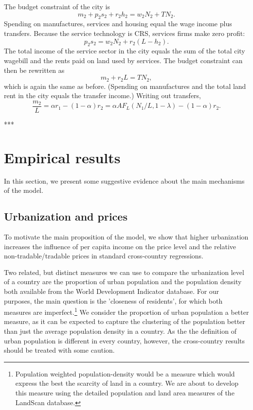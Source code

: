 \documentclass[12pt]{article}
\begin{document}
The budget constraint of the city is
\[
m_2 +p_2s_2+r_2h_2 = w_2N_2+TN_2.
\]
Spending on manufactures, services and housing equal the wage income plus transfers. Because the service technology is CRS, services firms make zero profit:
\[
p_2s_2 = w_2N_2+r_2(L-h_2).
\]
The total income of the service sector in the city equals the sum of the total city wagebill and the rents paid on land used by services. The budget constraint can then be rewritten as
\[
m_2 +r_2L = TN_2,
\]
which is again the same as before. (Spending on manufactures and the total land rent in the city equals the transfer income.) Writing out transfers,
\begin{equation}\label{eq:eq3b}
    \frac{m_2}{L} = \alpha r_1-(1-\alpha)r_2 = \alpha AF_L(N_1/L,1-{\lambda})-(1-\alpha)r_2.
\end{equation}

***


\section{Empirical results}
In this section, we present some suggestive evidence about the main
mechanisms of the model.

\subsection{Urbanization and prices}
To motivate the main proposition of the model, we show that higher
urbanization increases the influence of per capita income on the
price level and the relative non-tradable/tradable prices in
standard cross-country regressions.

Two related, but distinct measures we can use to compare the
urbanization level of a country are the proportion of urban
population and the population density both available from the World
Development Indicator database. For our purposes, the main question
is the 'closeness of residents', for which both measures are
imperfect.\footnote{Population weighted population-density would be
a measure which would express the best the scarcity of land in a
country. We are about to develop this measure using the detailed
population and land area measures of the LandScan database.} We
consider the proportion of urban population a better measure, as it
can be expected to capture the clustering of the population better
than just the average population density in a country. As the the
definition of urban population is different in every country,
however, the cross-country results should be treated with some
caution.
\end{document}
